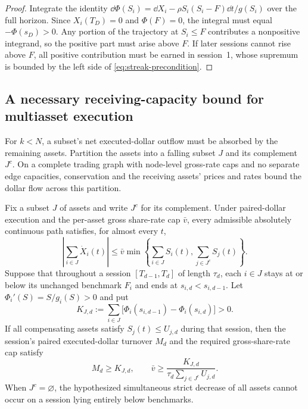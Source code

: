 \documentclass[review,hidelinks,onefignum,onetabnum]{siamonline250211}
\begin{document}
\begin{proof}
Integrate the identity $\dd\Phi(S_i)=\dd X_i-\rho S_i(S_i-F)\dd t/g(S_i)$ over the full horizon. Since $X_i(T_D)=0$ and $\Phi(F)=0$, the integral must equal $-\Phi(s_D)>0$. Any portion of the trajectory at $S_i\le F$ contributes a nonpositive integrand, so the positive part must arise above $F$. If later sessions cannot rise above $F$, all positive contribution must be earned in session~1, whose supremum is bounded by the left side of \eqref{eq:streak-precondition}.
\end{proof}


\subsection{A necessary receiving-capacity bound for multiasset execution}\label{subsec:multiday-cut}
For $k<N$, a subset's net executed-dollar outflow must be absorbed by the remaining assets. Partition the assets into a falling subset $J$ and its complement $J^c$. On a complete trading graph with node-level gross-rate caps and no separate edge capacities, conservation and the receiving assets' prices and rates bound the dollar flow across this partition.
\begin{proposition}\label{prop:market-cut}
Fix a subset $J$ of assets and write $J^c$ for its complement. Under paired-dollar execution and the per-asset gross share-rate cap $\bar v$, every admissible absolutely continuous path satisfies, for almost every $t$,
\begin{equation}\label{eq:market-cut-instant}
\boxed{\left|\sum_{i\in J}\dot X_i(t)\right|\le
\bar v\min\left\{\sum_{i\in J} S_i(t),\sum_{j\in J^c}S_j(t)\right\}.}
\end{equation}
Suppose that throughout a session $[T_{d-1},T_d]$ of length $\tau_d$, each $i\in J$ stays at or below its unchanged benchmark $F_i$ and ends at $s_{i,d}<s_{i,d-1}$. Let $\Phi_i'(S)=S/g_i(S)>0$ and put
\begin{equation}\label{eq:cut-required}
K_{J,d}:=\sum_{i\in J}\big[\Phi_i(s_{i,d-1})-\Phi_i(s_{i,d})\big]>0.
\end{equation}
If all compensating assets satisfy $S_j(t)\le U_{j,d}$ during that session, then the session's paired executed-dollar turnover $M_d$ and the required gross-share-rate cap satisfy
\begin{equation}\label{eq:cut-necessary}
\boxed{M_d\ge K_{J,d},\qquad
\bar v\ge\frac{K_{J,d}}{\tau_d\sum_{j\in J^c}U_{j,d}}.}
\end{equation}
When $J^c=\varnothing$, the hypothesized simultaneous strict decrease of all assets cannot occur on a session lying entirely below benchmarks.
\end{proposition}
\end{document}
